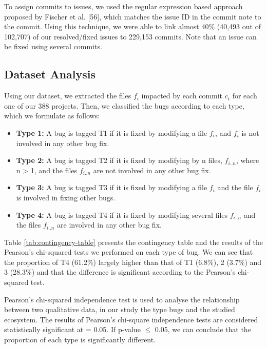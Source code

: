 \documentclass[12pt]{report}
\providecommand{\tightlist}{%
  \setlength{\itemsep}{0pt}\setlength{\parskip}{0pt}}
\begin{document}
To assign commits to issues, we used the regular expression based
approach proposed by Fischer et al. {[}56{]}, which matches the issue ID
in the commit note to the commit. Using this technique, we were able to
link almost 40\% (40,493 out of 102,707) of our resolved/fixed issues to
229,153 commits. Note that an issue can be fixed using several commits.

\subsection{\texorpdfstring{Dataset
Analysis\label{sec:dataset}}{Dataset Analysis}}\label{dataset-analysis}

Using our dataset, we extracted the files \(f_i\) impacted by each
commit \(c_i\) for each one of our 388 projects. Then, we classified the
bugs according to each type, which we formulate as follows:

\begin{itemize}
\tightlist
\item
  \textbf{Type 1:} A bug is tagged T1 if it is fixed by modifying a file
  \(f_i\), and \(f_i\) is not involved in any other bug fix.
\item
  \textbf{Type 2:} A bug is tagged T2 if it is fixed by modifying by n
  files, \(f_{i..n}\), where n \textgreater{} 1, and the files
  \(f_{i..n}\) are not involved in any other bug fix.
\item
  \textbf{Type 3:} A bug is tagged T3 if it is fixed by modifying a file
  \(f_{i}\) and the file \(f_{i}\) is involved in fixing other bugs.
\item
  \textbf{Type 4:} A bug is tagged T4 if it is fixed by modifying
  several files \(f_{i..n}\) and the files \(f_{i..n}\) are involved in
  any other bug fix.
\end{itemize}



Table \ref{tab:contingency-table} presents the contingency table and the
results of the Pearson's chi-squared tests we performed on each type of
bug. We can see that the proportion of T4 (61.2\%) largely higher than
that of T1 (6.8\%), 2 (3.7\%) and 3 (28.3\%) and that the difference is
significant according to the Pearson's chi-squared test.

Pearson's chi-squared independence test is used to analyse the
relationship between two qualitative data, in our study the type bugs
and the studied ecosystem. The results of Pearson's chi-square
independence tests are considered statistically significant at = 0.05.
If p-value \(\leq\) 0.05, we can conclude that the proportion of each
type is significantly different.
\end{document}
